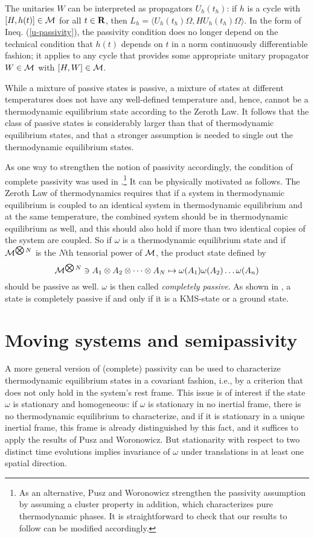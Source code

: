 \documentclass[a4paper,11pt]{article}
\def\dt{\cal}
\def\dM{{\dt M}}
\def\gO{\Omega}
\def\go{\omega}
\def\reals{{\bf R}}
\begin{document}
The unitaries $W$ can be interpreted as
propagators $U_h(t_h)$: if $h$ is a cycle with $[H,h(t)]\in\dM$
for all $t\in\reals$, then
$L_h=\langle U_h(t_h)\gO,HU_h(t_h)\gO\rangle.$
In the form of Ineq. (\ref{u-passivity}),
the passivity condition does no longer depend
on the technical condition that
$h(t)$ depends on $t$ in a norm continuously differentiable
fashion; it applies to any cycle that provides some appropriate
unitary propagator $W\in\dM$ with $[H,W]\in\dM$.

While a mixture of passive states is passive,
a mixture of states at different temperatures
does not have any well-defined temperature and, hence, cannot be a
thermodynamic equilibrium state according to the Zeroth Law. It follows
that the class of passive states is considerably larger than that of
thermodynamic equilibrium states, and that a stronger assumption is
needed to single out the thermodynamic equilibrium states.

As one way to strengthen the notion of passivity accordingly,
the condition of complete passivity was used in \cite{PW78}.\footnote{
As an alternative, Pusz and Woronowicz strengthen the passivity
assumption by assuming a cluster property in addition, which
characterizes pure thermodynamic phases. It is
straightforward to check that our results to follow can be
modified accordingly.} It can be
physically motivated as follows. The Zeroth Law of thermodynamics requires
that if a system in thermodynamic equilibrium is coupled to
an identical system in thermodynamic equilibrium and at the
same temperature, the combined system should be in thermodynamic
equilibrium as well, and this should also hold if more than two
identical copies of the system are coupled. So if $\go$ is a
thermodynamic equilibrium state and if
$\dM^{\bigotimes N}$ is the $N$th tensorial power of $\dM$,
the product state defined by
$$\dM^{\bigotimes N}\ni A_1\otimes A_2\otimes\dots
\otimes A_N\mapsto\go(A_1)\go(A_2)\dots\go(A_n)$$
should be passive as well. $\go$ is then called
{\it completely passive}. As shown
in \cite{PW78}, a state is completely passive if and only if it is
a KMS-state or a ground state.


\section{Moving systems and semipassivity}\label{covariant version}

A more general version of (complete) passivity can be used to characterize
thermodynamic equilibrium states in a covariant fashion, i.e., by
a criterion that does not only hold in the system's rest frame.
This issue is of
interest if the state $\go$ is stationary and homogeneous: if $\go$ is
stationary in no inertial frame, there is no thermodynamic equilibrium
to characterize, and if it is stationary in a unique inertial frame,
this frame is already distinguished by this fact, and it suffices to
apply the results of Pusz and Woronowicz. But
stationarity with respect to two distinct time evolutions implies
invariance of $\go$ under translations in at least one spatial direction.
\end{document}
